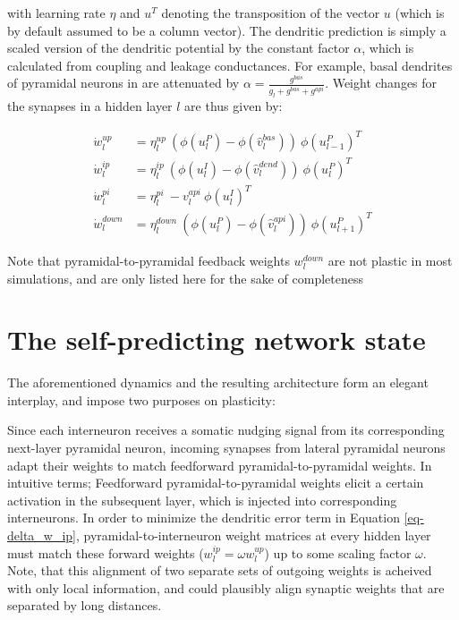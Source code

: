 with learning rate $\eta$ and $u^T$ denoting the transposition of the vector $u$ (which is by default assumed to be
a column vector). The dendritic
prediction is simply a scaled version of the dendritic potential by the constant factor $\alpha$, which is calculated
from coupling and leakage conductances. For example, basal dendrites of pyramidal neurons in \cite{sacramento2018dendritic}
are attenuated by $\alpha = \frac{g^{bas}}{g_l + g^{bas} + g^{api}}$. Weight changes for the synapses in a hidden layer
$l$ are thus given by:

\begin{align}
  \dot{w}_{l}^{up}   & = \eta_l^{up} \ ( \phi(u_l^{P}) - \phi(\hat{v}_l^{bas}) ) \ \phi(u_{l-1}^{P})^T                     \\
  \dot{w}_{l}^{ip}   & = \eta_l^{ip} \ ( \phi(u_l^{I}) - \phi(\hat{v}_l^{dend}) ) \ \phi(u_{l}^{P})^T\label{eq-delta_w_ip} \\
  \dot{w}_{l}^{pi}   & = \eta_l^{pi} \ - v_l^{api} \ \phi(u_l^{I})^T\label{eq-delta_w_pi}                                  \\
  \dot{w}_{l}^{down} & = \eta_l^{down} \ ( \phi(u_l^{P}) - \phi(\hat{v}_l^{api}) )\ \phi(u_{l+1}^{P})^T
\end{align}

Note that pyramidal-to-pyramidal feedback weights $w_l^{down}$ are not plastic in most simulations, and are only listed
here for the sake of completeness 


\section{The self-predicting network state}

The aforementioned dynamics and the resulting architecture form an elegant interplay, and impose two
purposes on plasticity:

Since each interneuron receives a somatic nudging signal from its corresponding next-layer pyramidal neuron, incoming
synapses from lateral pyramidal neurons adapt their weights to match feedforward pyramidal-to-pyramidal weights. In
intuitive terms; Feedforward pyramidal-to-pyramidal weights elicit a certain activation in the subsequent layer, which
is injected into corresponding interneurons. In order to minimize the dendritic error term in Equation
\ref{eq-delta_w_ip}, pyramidal-to-interneuron weight matrices at every hidden layer must match these forward weights
($w_l^{ip} = \omega w_l^{up}$) up to some scaling factor $\omega$.
Note, that this alignment of two separate sets of outgoing weights is acheived with only local information, and could
plausibly align synaptic weights that are separated by long distances. \newline

